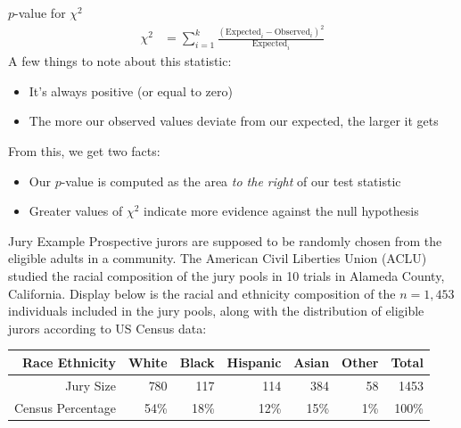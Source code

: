 \documentclass{beamer}
\begin{document}
\begin{frame}{$p$-value for $\chi^2$}
\begin{align*}
\chi^2 &= \sum_{i=1}^k \frac{(\text{Expected}_i - \text{Observed}_i)^2}{\text{Expected}_i} 
\end{align*}
A few things to note about this statistic:
\begin{itemize}
\item It's always positive (or equal to zero)
\item The more our observed values deviate from our expected, the larger it gets
\end{itemize}
From this, we get two facts:
\begin{itemize}
\item Our $p$-value is computed as the area \textit{to the right} of our test statistic
\item Greater values of $\chi^2$ indicate more evidence against the null hypothesis
\end{itemize}
\end{frame}


\begin{frame}{Jury Example}
Prospective jurors are supposed to be randomly chosen from the eligible adults in a community. The American Civil Liberties Union (ACLU) studied the racial composition of the jury pools in 10 trials in Alameda County, California. Display below is the racial and ethnicity composition of the $n = 1,453$ individuals included in the jury pools, along with the distribution of eligible jurors according to US Census data: \vspace{3mm} 
\footnotesize
\begin{table}[ht]
\centering
\begin{tabular}{rrrrrrr}
  \hline
Race Ethnicity & White & Black & Hispanic & Asian & Other & Total \\ 
  \hline
Jury Size & 780 & 117 & 114 & 384 & 58 & 1453 \\
Census Percentage & 54\% & 18\% & 12\% & 15\% & 1\% & 100\% \\
   \hline
\end{tabular}
\end{table}
\end{frame}
\end{document}
